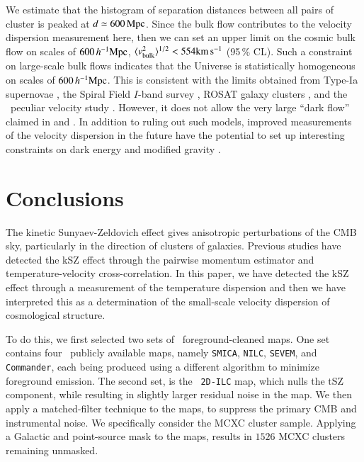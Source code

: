 \documentclass[traditabstract, longauth]{aa}
\newcommand{\nilc}{{\tt NILC}}
\newcommand{\sevem}{{\tt SEVEM}}
\newcommand{\smica}{{\tt SMICA}}
\newcommand{\commander}{{\tt Commander}}
\newcommand{\1}{\'\i }
\def \kms{{\rm km\,s^{-1}}}
\begin{document}
We estimate that the histogram of separation distances between all pairs of
cluster is peaked at $d \simeq 600\,{\rm Mpc}$.
Since the bulk flow contributes to the velocity dispersion measurement here,
then we can set an upper limit on the cosmic bulk flow on scales of
$600\,h^{-1}{\rm Mpc}$, $\langle v_{\rm bulk}^{2}\rangle^{1/2}<554\kms$
(95\,\% CL).
Such a constraint on large-scale bulk flows indicates that the Universe is
statistically homogeneous on scales of $600\,h^{-1}{\rm Mpc}$.
This is consistent with the limits obtained from
Type-Ia supernovae \citep{snbf2013}, the Spiral Field $I$-band
survey \citep{nusserdavis11,mascott12}, ROSAT galaxy clusters \citep{Mody12},
and the \Planck\ peculiar velocity study \citep{planck2013-XIII}.
However, it does not allow the very large ``dark flow'' claimed
in \cite{kashlinsky08,kashlinsky10,kashlinsky12} and \cite{Barandela15}. 
In addition to ruling out such models,
improved measurements of the velocity dispersion in the future have the
potential to set up interesting constraints on dark energy and modified
gravity \citep{Bhattacharya07,Bhattacharya08DE}.


\section{Conclusions}
\label{sec:conclusions}

The kinetic Sunyaev-Zeldovich effect gives anisotropic perturbations of the
CMB sky, particularly in the direction of clusters of galaxies.  Previous
studies have detected the kSZ effect through the pairwise momentum
estimator and temperature-velocity cross-correlation. In this paper, we have
detected the kSZ effect through a measurement of the temperature dispersion
and then we have interpreted this as a determination of the small-scale
velocity dispersion of cosmological structure.

To do this, we first selected two sets of \Planck\ foreground-cleaned maps.
One set contains four \Planck\ publicly available maps, namely \smica, \nilc,
\sevem, and \commander, each being produced using a different algorithm to
minimize foreground emission. The second set, is the \Planck\ {\tt 2D-ILC}
map, which nulls the tSZ component, while resulting in slightly larger residual
noise in the map. We then apply a matched-filter technique to the maps,
to suppress the primary CMB and instrumental noise.
We specifically consider the MCXC cluster sample.  Applying a Galactic
and point-source mask to the maps, results in $1526$ MCXC clusters
remaining unmasked.
\end{document}
